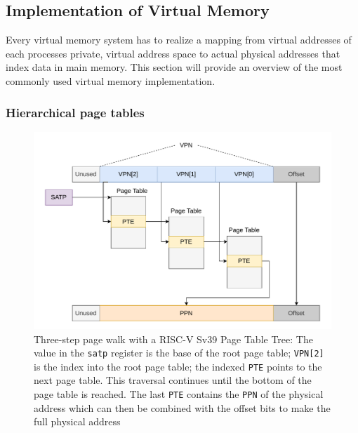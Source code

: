 \subsection{Implementation of Virtual Memory}
Every virtual memory system has to realize a mapping from virtual addresses of each processes
private, virtual address space to actual physical addresses that index data in main memory.
This section will provide an overview of the most commonly used virtual memory implementation.

\subsubsection{Hierarchical page tables}
\begin{figure}[t]
    \centering
    \includegraphics[scale=.8]{figures/VM-Tree.pdf}
    \caption[RISC-V Sv39 3-Level Page Tree]{Three-step page walk with a RISC-V Sv39 Page Table Tree:
        The value in the \texttt{satp} register is the base of the root page table; \texttt{VPN[2]}
        is the index into the root page table; the indexed \texttt{PTE} points to the next page table.
        This traversal continues until the bottom of the page table is reached. The last \texttt{PTE}
        contains the \texttt{PPN} of the physical address which can then be combined with the offset
        bits to make the full physical address}
    \label{fig:fund:pagetree}
\end{figure}


